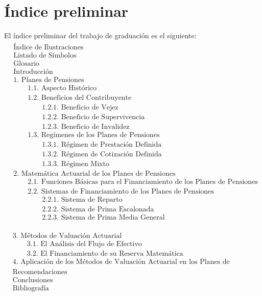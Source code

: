 \documentclass[12pt,letterpaper,titlepage]{article}
\begin{document}
\section{Índice preliminar}
El índice preliminar del trabajo de graduación es el siguiente:
\begin{align*}
&\text{Índice de Ilustraciones}\\
&\text{Listado de Símbolos}\\
&\text{Glosario}\\
&\text{Introducción}\\
&\text{1. Planes de Pensiones}\\
&\qquad\text{1.1. Aspecto Histórico }\\
&\qquad\text{1.2. Beneficios del Contribuyente }\\
&\qquad\qquad\text{1.2.1. Beneficio de Vejez}\\
&\qquad\qquad\text{1.2.2. Beneficio de Supervivencia}\\
&\qquad\qquad\text{1.2.3. Beneficio de Invalidez}\\
&\qquad\text{1.3. Regímenes de los Planes de Pensiones}\\
&\qquad\qquad\text{1.3.1. Régimen de Prestación Definida}\\
&\qquad\qquad\text{1.3.2. Régimen de Cotización Definida}\\
&\qquad\qquad\text{1.3.3. Régimen Mixto}\\
&\text{2. Matemática Actuarial de los Planes de Pensiones}\\
&\qquad\text{2.1. Funciones Básicas para el Financiamiento de los Planes de Pensiones}\\
&\qquad\text{2.2. Sistemas de Financiamiento de los Planes de Pensiones}\\
&\qquad\qquad\text{2.2.1. Sistema de Reparto}\\
&\qquad\qquad\text{2.2.2. Sistema de Prima Escalonada}\\
&\qquad\qquad\text{2.2.3. Sistema de Prima Media General}\\
\end{align*}

\newpage
\begin{align*}
&\text{3. Métodos de Valuación Actuarial}\\
&\qquad\text{3.1. El Análisis del Flujo de Efectivo}\\
&\qquad\text{3.2. El Financiamiento de su Reserva Matemática}\\
&\text{4. Aplicación de los Métodos de Valuación Actuarial en los Planes de Pensiones Ocupacionales}\\
&\text{Recomendaciones}\\
&\text{Conclusiones}\\
&\text{Bibliografía} 
\end{align*}

\newpage

\section{}


\label{fin}
\end{document}
